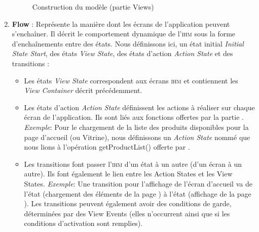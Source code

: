 \begin{enumerate}
\begin{figure}[H]
  \caption{Construction du modèle (partie Views)}
  \label{fig:Construction du modèle (partie Views)}
\end{figure}
\item \textbf{Flow} : Représente la manière dont les écrans de l'application peuvent s'enchaîner. Il décrit le comportement dynamique de l'\textsc{ihm} sous la forme d'enchaînements entre des états. Nous définissons ici, un état initial \textit{Initial State Start}, des états \textit{View State}, des états d'action \textit{Action State} et des transitions :
\begin{itemize}
\item Les états \textit{View State} correspondent aux écrans \textsc{ihm} et contiennent les \textit{View Container} décrit précédemment.
\item Les états d'action \textit{Action State} définissent les actions à réaliser sur chaque écran de l'application. Ils sont liés aux fonctions offertes par la partie \kwsoa{}. 
\newline
\textit{Exemple}: Pour le chargement de la liste des produits disponibles pour la page d'accueil (ou Vitrine), nous définissons un \textit{Action State} nommé  que nous lions à l'opération getProductList() offerte par \kwsoa{}.  
\item Les transitions  font passer l'\textsc{ihm} d'un état à un autre (d'un écran à un autre). Ils font également le lien entre les Action States et les View States. 
\newline
\textit{Exemple}: Une transition pour l'affichage de l'écran d'accueil  va de l'état  (chargement des éléments de la page ) à l'état  (affichage de la page ).
\newline
Les transitions peuvent également avoir des conditions de garde, déterminées par des View Events (elles n'occurrent ainsi que si les conditions d'activation sont remplies).
\end{itemize}
\end{enumerate}       
